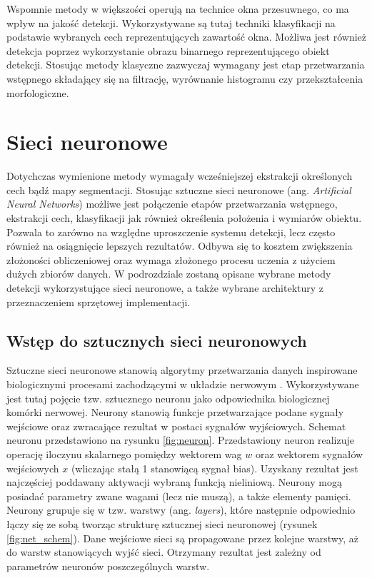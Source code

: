 
Wspomnie metody w większości operują na technice okna przesuwnego, co ma wpływ na jakość detekcji.
Wykorzystywane są tutaj techniki klasyfikacji na podstawie wybranych cech reprezentujących zawartość okna.
Możliwa jest również detekcja poprzez wykorzystanie obrazu binarnego reprezentującego obiekt detekcji.
Stosując metody klasyczne zazwyczaj wymagany jest etap przetwarzania wstępnego składający się na filtrację, wyrównanie histogramu czy przekształcenia morfologiczne.


\section{Sieci neuronowe}

Dotychczas wymienione metody wymagały wcześniejszej ekstrakcji określonych cech bądź mapy segmentacji.
Stosując sztuczne sieci neuronowe (ang. \emph{Artificial Neural Networks}) możliwe jest połączenie etapów przetwarzania wstępnego, ekstrakcji cech, klasyfikacji jak również określenia położenia i wymiarów obiektu. 
Pozwala to zarówno na względne uproszczenie systemu detekcji, lecz często również na osiągnięcie lepszych rezultatów. 
Odbywa się to kosztem zwiększenia złożoności obliczeniowej oraz wymaga złożonego procesu uczenia z użyciem dużych zbiorów danych.
W podrozdziale zostaną opisane wybrane metody detekcji wykorzystujące sieci neuronowe, a także wybrane architektury z przeznaczeniem sprzętowej implementacji.

\subsection{Wstęp do sztucznych sieci neuronowych}
Sztuczne sieci neuronowe stanowią algorytmy przetwarzania danych inspirowane biologicznymi procesami zachodzącymi w układzie nerwowym \cite{SN_tadeusiewicz}. 
Wykorzystywane jest tutaj pojęcie tzw. sztucznego neuronu jako odpowiednika biologicznej komórki nerwowej. 
Neurony stanowią funkcje przetwarzające podane sygnały wejściowe oraz zwracające rezultat w postaci sygnałów wyjściowych. 
Schemat neuronu przedstawiono na rysunku \ref{fig:neuron}.
Przedstawiony neuron realizuje operację iloczynu skalarnego pomiędzy wektorem wag $w$ oraz wektorem sygnałów wejściowych $x$ (wliczając stałą 1 stanowiącą sygnał bias).
Uzyskany rezultat jest najczęściej poddawany aktywacji wybraną funkcją nieliniową.
Neurony mogą posiadać parametry zwane wagami (lecz nie muszą), a także elementy pamięci.
Neurony grupuje się w tzw. warstwy (ang. \emph{layers}), które następnie odpowiednio łączy się ze sobą tworząc strukturę sztucznej sieci neuronowej (rysunek \ref{fig:net_schem}).
Dane wejściowe sieci są propagowane przez kolejne warstwy, aż do warstw stanowiących wyjść sieci.
Otrzymany rezultat jest zależny od parametrów neuronów poszczególnych warstw.

